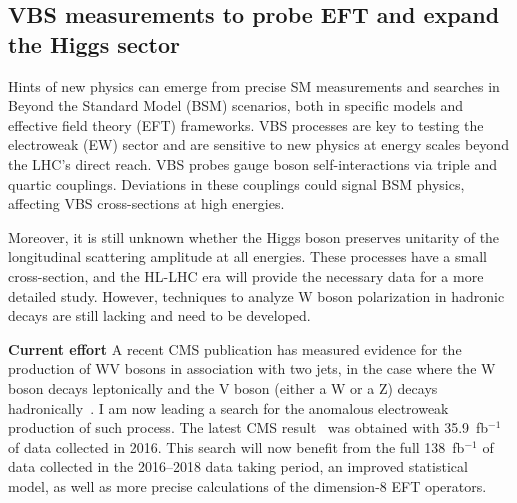 {\begin{flushleft}
\section{VBS measurements to probe EFT and expand the Higgs sector}
\vskip 5pt

Hints of new physics can emerge from precise SM measurements and searches in Beyond the Standard Model (BSM) scenarios, both in specific models and effective field theory (EFT) frameworks. VBS processes are key to testing the electroweak (EW) sector and are sensitive to new physics at energy scales beyond the LHC’s direct reach. VBS probes gauge boson self-interactions via triple and quartic couplings. Deviations in these couplings could signal BSM physics, affecting VBS cross-sections at high energies. 

Moreover, it is still unknown whether the Higgs boson preserves unitarity of the longitudinal scattering amplitude at all energies. These processes have a small cross-section, and the HL-LHC era will provide the necessary data for a more detailed study. However, techniques to analyze W boson polarization in hadronic decays are still lacking and need to be developed.

\textbf{Current effort}
A recent CMS publication has measured evidence for the production of WV bosons in association with two jets, in the case where the W boson decays leptonically and the V boson (either a W or a Z) decays hadronically~\cite{[1]}. I am now leading a search for the anomalous electroweak production of such process. The latest CMS result~\cite{[2]} was obtained with 35.9~fb$^{-1}$ of data collected in 2016. This search will now benefit from the full 138~fb$^{-1}$ of data collected in the 2016--2018 data taking period, an improved statistical model, as well as more precise calculations of the dimension-8 EFT operators. %


\end{flushleft}}
